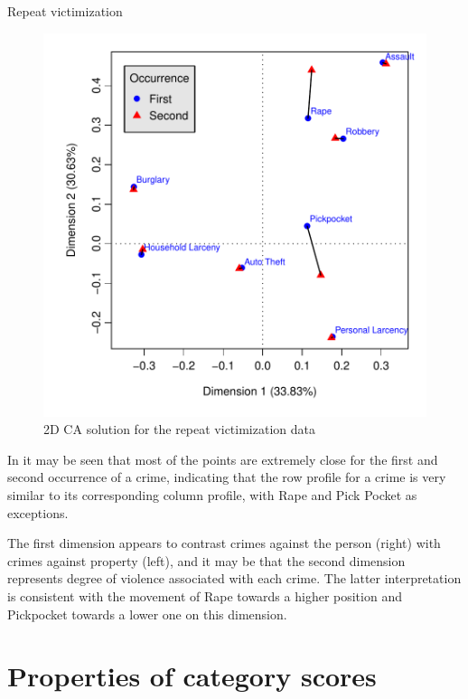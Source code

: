 \documentclass[11pt]{book}\usepackage[]{graphicx}\usepackage[]{color}
\newenvironment{knitrout}{}{} %
\renewenvironment{knitrout}{\small\renewcommand{\baselinestretch}{.85}}{} %
\begin{document}
\begin{Example}[victims2]{Repeat victimization}
\begin{knitrout}
\begin{figure}[htbp]
\centerline{\includegraphics{ch06/fig/ca-victims-plot} }

\caption[2D CA solution for the repeat victimization data]{2D CA solution for the repeat victimization data\label{fig:ca-victims-plot}}
\end{figure}


\end{knitrout}


In  it may be seen that most of the points are
extremely close for the first and second occurrence of a crime,  indicating
that the row profile for a crime is very similar to its corresponding column
profile, with Rape and Pick Pocket as exceptions.

The first dimension appears to contrast crimes against the person (right) with
crimes against property (left), and it may be that the second dimension
represents degree of violence associated with each crime.
The latter interpretation is consistent with the movement of Rape towards
a higher position and Pickpocket towards a lower one on this dimension.


\end{Example}


\section{Properties of category scores}\label{sec:ca-scores}
\end{document}

